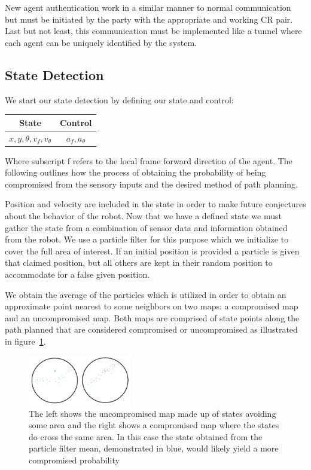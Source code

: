 \documentclass[conference]{IEEEtran}
\begin{document}
New agent authentication work in a similar manner to normal communication but must be initiated by the party with the appropriate and working CR pair. Last but not least, this communication must be implemented like a tunnel where each agent can be uniquely identified by the system.

\subsection{State Detection}

We start our state detection by defining our state and control:

\begin{table}[h]
\label{table_example}
\begin{center}
\begin{tabular}{|c|c|}
\hline
State & Control\\
\hline
$x,y,\theta,v_f,v_\theta$ & $a_f,a_\theta$\\
\hline
\end{tabular}
\end{center}
\end{table}

Where subscript f refers to the local frame forward direction of the agent. The following outlines how the process of obtaining the probability of being compromised from the sensory inputs and the desired method of path planning.

Position and velocity are included in the state in order to make future conjectures about the behavior of the robot. Now that we have a defined state we must gather the state from a combination of sensor data and information obtained from the robot. We use a particle filter for this purpose which we initialize to cover the full area of interest. If an initial position is provided a particle is given that claimed position, but all others are kept in their random position to accommodate for a false given position.
	
We obtain the average of the particles  which is utilized in order to obtain an approximate point nearest to some neighbors on two maps: a compromised map and an uncompromised map. Both maps are comprised of state points along the path planned that are considered compromised or uncompromised as illustrated in figure~\ref{fig:compmaps}.
	
\begin{figure}[h]
\centering
\includegraphics[width=0.4\textwidth]{Path_comp_uncomp}
\caption{The left shows the uncompromised map made up of states avoiding some area and the right shows a compromised map where the states do cross the same area. In this case the state obtained from the particle filter mean, demonstrated in blue, would likely yield a more compromised probability}
\label{fig:compmaps}
\end{figure}
	
\end{document}
